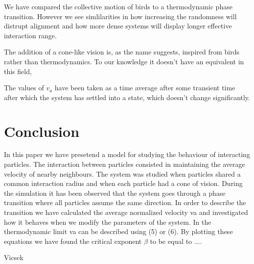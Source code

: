 \documentclass[twoside,twocolumn]{article}
\begin{document}
We have compared the collective motion of birds to a thermodynamic phase 
transition. However we see simlilarities in how increasing the randomness will distrupt alignment and how more dense systems will display longer effective interaction range.

The addition of a cone-like vision is, as the name suggests, inspired from birds rather than thermodynamics. To our knowledge it doesn't have an equivalent in this field, 

The values of $v_a$ have been taken as a time average after some transient time after which the system has settled into a state, which doesn't change significantly.




\section{Conclusion}

In this paper we have presetend a model for studying the behaviour of interacting particles. The interaction between particles consisted in maintaining the average velocity of nearby neighbours. The system was studied when particles shared a common interaction radius and when each particle had a cone of vision. During the simulation it has been observed that the system goes through a phase transition where all particles assume the same direction. In order to describe the transition we have calculated the average normalized velocity va and investigated how it behaves when we modify the parameters of the system. In the thermodynamic limit va can be described using (5) or (6).
By plotting these equations we have found  the critical exponent $\beta$ to be equal to ....



\begin{thebibliography}{99} %

  Vicsek
 
\end{thebibliography}

\end{document}
